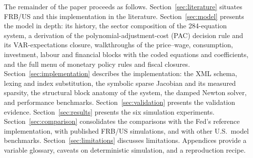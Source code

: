 The remainder of the paper proceeds as follows. Section~\ref{sec:literature} situates FRB/US and this implementation in the literature. Section~\ref{sec:model} presents the model in depth: its history, the sector composition of the 284-equation system, a derivation of the polynomial-adjustment-cost (PAC) decision rule and its VAR-expectations closure, walkthroughs of the price--wage, consumption, investment, labour and financial blocks with the coded equations and coefficients, and the full menu of monetary policy rules and fiscal closures. Section~\ref{sec:implementation} describes the implementation: the XML schema, lexing and index substitution, the symbolic sparse Jacobian and its measured sparsity, the structural block anatomy of the system, the damped Newton solver, and performance benchmarks. Section~\ref{sec:validation} presents the validation evidence. Section~\ref{sec:results} presents the six simulation experiments. Section~\ref{sec:comparison} consolidates the comparisons with the Fed's reference implementation, with published FRB/US simulations, and with other U.S.\ model benchmarks. Section~\ref{sec:limitations} discusses limitations. Appendices provide a variable glossary, caveats on deterministic simulation, and a reproduction recipe.
